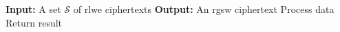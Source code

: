 \begin{algorithm}
\caption{HomExpand}
\label{alg:HomExpand}
\begin{algorithmic}[1] %
    \State \textbf{Input:} A set $\mathcal{S}$ of \gls{rlwe} ciphertexts
    \State \textbf{Output:} An \gls{rgsw} ciphertext
        \State Process data
    \EndFor
    \State Return result
\end{algorithmic}
\end{algorithm}

\clearpage




